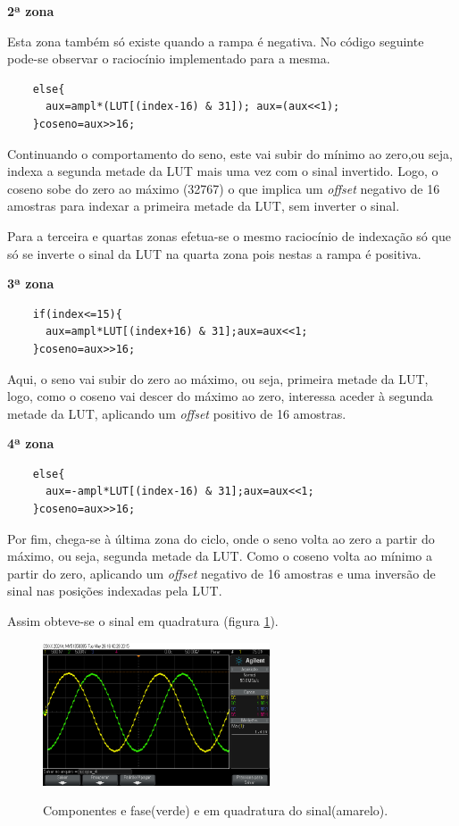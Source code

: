 \documentclass[11pt]{article}
\numberwithin{equation}{section}
\begin{document}
\textbf{2ª zona}

Esta zona também só existe quando a rampa é negativa. No código seguinte pode-se observar o raciocínio implementado para a mesma.
\begin{lstlisting}
	else{
	  aux=ampl*(LUT[(index-16) & 31]); aux=(aux<<1);
	}coseno=aux>>16;
\end{lstlisting}

Continuando o comportamento do seno, este vai subir do mínimo ao zero,ou seja, indexa a segunda metade da LUT mais uma vez com o sinal invertido. Logo, o coseno sobe do zero ao máximo (32767) o que implica um \textit{offset} negativo de 16 amostras para indexar a primeira metade da LUT, sem inverter o sinal.

Para a terceira e quartas zonas efetua-se o mesmo raciocínio de indexação só que só se inverte o sinal da LUT na quarta zona pois nestas a rampa é positiva.
\vspace{1mm}

\textbf{3ª zona}
\begin{lstlisting}
	if(index<=15){
	  aux=ampl*LUT[(index+16) & 31];aux=aux<<1;
	}coseno=aux>>16;
\end{lstlisting}

Aqui, o seno vai subir do zero ao máximo, ou seja, primeira metade da LUT, logo, como o coseno vai descer do máximo ao zero, interessa aceder à segunda metade da LUT, aplicando um \textit{offset} positivo de 16 amostras.
\vspace{1mm}

\textbf{4ª zona}
\begin{lstlisting}
	else{
	  aux=-ampl*LUT[(index-16) & 31];aux=aux<<1;
	}coseno=aux>>16;
\end{lstlisting}

Por fim, chega-se à última zona do ciclo, onde o seno volta ao zero a partir do máximo, ou seja, segunda metade da LUT. Como o coseno volta ao mínimo a partir do zero, aplicando um \textit{offset} negativo de 16 amostras e uma inversão de sinal nas posições indexadas pela LUT.

Assim obteve-se o sinal em quadratura (figura \ref{quad}).
\begin{figure}[h]
	\centering     
	\includegraphics[width=0.6\textwidth]{./quadratura}~\\
	\caption{Componentes e fase(verde) e em quadratura do sinal(amarelo).}
	\label{quad}
\end{figure}
\end{document}
